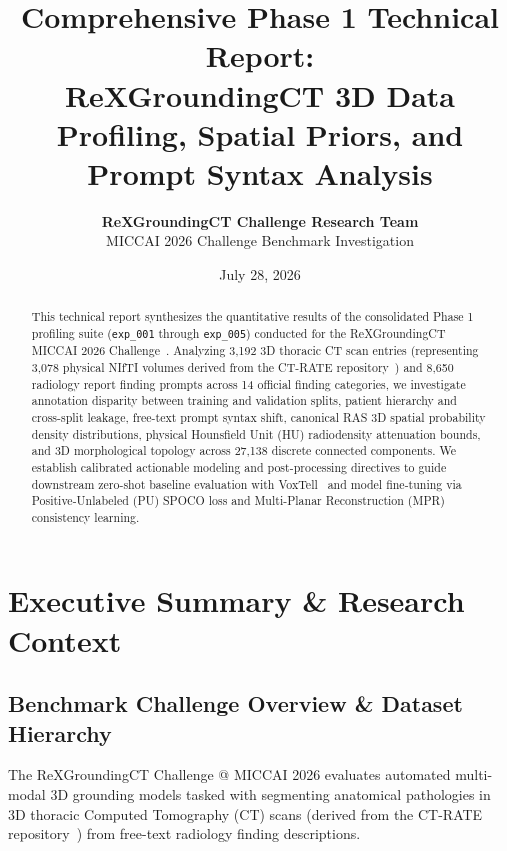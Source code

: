 \documentclass[11pt,a4paper]{article}
\title{\textbf{Comprehensive Phase 1 Technical Report:\\ReXGroundingCT 3D Data Profiling, Spatial Priors, and Prompt Syntax Analysis}}
\author{\textbf{ReXGroundingCT Challenge Research Team}\\
\small MICCAI 2026 Challenge Benchmark Investigation}
\date{July 28, 2026}
\begin{document}
\maketitle

\begin{abstract}
This technical report synthesizes the quantitative results of the consolidated Phase 1 profiling suite (\texttt{exp\_001} through \texttt{exp\_005}) conducted for the ReXGroundingCT MICCAI 2026 Challenge~\cite{baharoon2025rexgroundingct}. Analyzing 3,192 3D thoracic CT scan entries (representing 3,078 physical NIfTI volumes derived from the CT-RATE repository~\cite{hamamci2024ctrate}) and 8,650 radiology report finding prompts across 14 official finding categories, we investigate annotation disparity between training and validation splits, patient hierarchy and cross-split leakage, free-text prompt syntax shift, canonical RAS 3D spatial probability density distributions, physical Hounsfield Unit (HU) radiodensity attenuation bounds, and 3D morphological topology across 27,138 discrete connected components. We establish calibrated actionable modeling and post-processing directives to guide downstream zero-shot baseline evaluation with VoxTell~\cite{luo2025voxtell} and model fine-tuning via Positive-Unlabeled (PU) SPOCO loss and Multi-Planar Reconstruction (MPR) consistency learning.
\end{abstract}

\tableofcontents
\newpage

\section{Executive Summary \& Research Context}

\subsection{Benchmark Challenge Overview \& Dataset Hierarchy}
The ReXGroundingCT Challenge @ MICCAI 2026 evaluates automated multi-modal 3D grounding models tasked with segmenting anatomical pathologies in 3D thoracic Computed Tomography (CT) scans (derived from the CT-RATE repository~\cite{hamamci2024ctrate}) from free-text radiology finding descriptions. 
\end{document}
